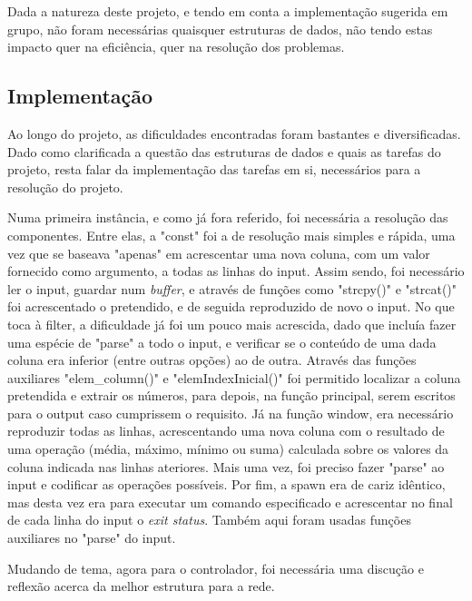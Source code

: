 \documentclass[a4paper]{article}
\begin{document}
\hspace{3mm} Dada a natureza deste projeto, e tendo em conta a implementação sugerida em grupo, não foram necessárias quaisquer estruturas de dados, não tendo estas impacto quer na eficiência, quer na resolução dos problemas. 



\subsection{Implementação}
\label{sec:5}

\hspace{3mm} Ao longo do projeto, as dificuldades encontradas foram bastantes e diversificadas.
Dado como clarificada a questão das estruturas de dados e quais as tarefas do projeto, resta falar da implementação das tarefas em si, necessários para a resolução do projeto. 
\par Numa primeira instância, e como já fora referido, foi necessária a resolução das componentes. Entre elas, a "const" foi a de resolução mais simples e rápida, uma vez que se baseava "apenas" em acrescentar uma nova coluna, com um valor fornecido como argumento, a todas as linhas do input. Assim sendo, foi necessário ler o input, guardar num \emph{buffer}, e através de funções como "strcpy()" e "strcat()" foi acrescentado o pretendido, e de seguida reproduzido de novo o input.
No que toca à filter, a dificuldade já foi um pouco mais acrescida, dado que incluía fazer uma espécie de "parse" a todo o input, e verificar se o conteúdo de uma dada coluna era inferior (entre outras opções) ao de outra. Através das funções auxiliares "elem_column()" e "elemIndexInicial()" foi permitido localizar a coluna pretendida e extrair os números, para depois, na função principal, serem escritos para o output caso cumprissem o requisito.
Já na função window, era necessário reproduzir todas as linhas, acrescentando uma nova coluna com o resultado de uma operação (média, máximo, mínimo ou suma) calculada sobre os valores da coluna indicada nas linhas ateriores. Mais uma vez, foi preciso fazer "parse" ao input e codificar as operações possíveis.
Por fim, a spawn era de cariz idêntico, mas desta vez era para executar um comando especificado e acrescentar no final de cada linha do input o \emph{exit status}. Também aqui foram usadas funções auxiliares no "parse" do input.
\par Mudando de tema, agora para o controlador, foi necessária uma discução e reflexão acerca da melhor estrutura para a rede.
\end{document}
